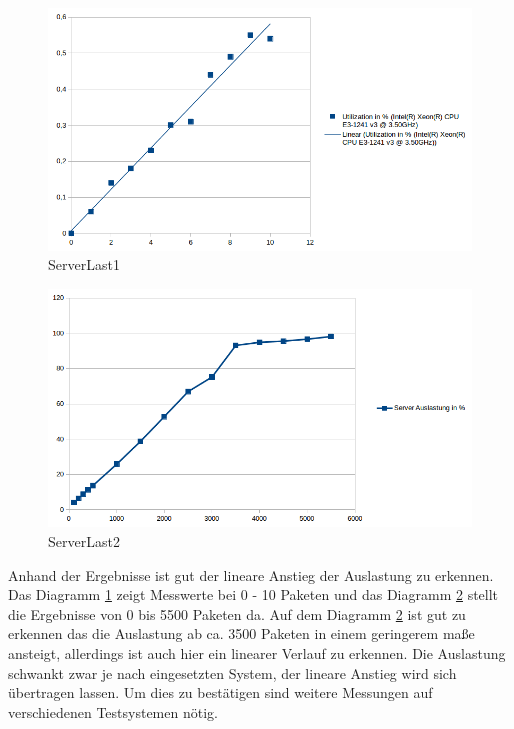 \documentclass[a4paper]{spie}  %
\begin{document}
\begin{figure}[H]
	\vspace{0pt}
	\hfill
	\vspace{0pt}	
	\centering
	\includegraphics[width=1\textwidth]{./images/ServerLast1.png}
	\caption{ServerLast1}
	\label{fig:ServerLast1}
\end{figure}

\begin{figure}[H]
	\vspace{0pt}
	\hfill
	\vspace{0pt}	
	\centering
	\includegraphics[width=1\textwidth]{./images/ServerLast3.png}
	\caption{ServerLast2}
	\label{fig:ServerLast2}
\end{figure}

Anhand der Ergebnisse ist gut der lineare Anstieg der Auslastung zu erkennen. Das Diagramm \ref{fig:ServerLast1} zeigt Messwerte bei 0 - 10 Paketen und das Diagramm \ref{fig:ServerLast2} stellt die Ergebnisse von 0 bis 5500 Paketen da. Auf dem Diagramm \ref{fig:ServerLast2} ist gut zu erkennen das die Auslastung ab ca. 3500 Paketen in einem geringerem maße ansteigt, allerdings ist auch hier ein linearer Verlauf zu erkennen. Die Auslastung schwankt zwar je nach eingesetzten System, der lineare Anstieg wird sich übertragen lassen. Um dies zu bestätigen sind weitere Messungen auf verschiedenen Testsystemen nötig.
\end{document}
